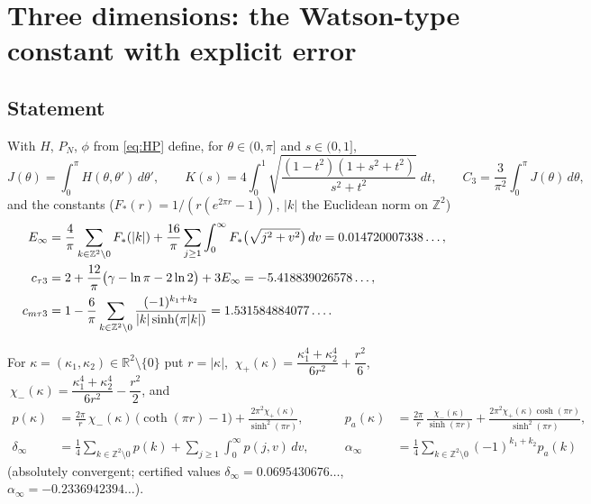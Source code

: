 \documentclass[11pt,a4paper]{article}
\newcommand{\R}{\mathbb R}
\newcommand{\Z}{\mathbb Z}
\theoremstyle{plain}
\theoremstyle{definition}
\numberwithin{equation}{section}
\begin{document}
\section{Three dimensions: the Watson-type constant with explicit error}\label{sec:d3}

\subsection{Statement}
With $H$, $P_N$, $\phi$ from \eqref{eq:HP} define, for $\theta\in(0,\pi]$ and $s\in(0,1]$,
\begin{equation}\label{eq:JK}
J(\theta)=\int_0^\pi H(\theta,\theta')\,d\theta',\qquad K(s)=4\int_0^1\sqrt{\frac{(1-t^2)(1+s^2+t^2)}{s^2+t^2}}\;dt,\qquad C_3=\frac{3}{\pi^2}\int_0^\pi J(\theta)\,d\theta ,
\end{equation}
and the constants ($F_*(r)=1/(r(e^{2\pi r}-1))$, $|k|$ the Euclidean norm on $\Z^2$)
\begin{align}
E_\infty&=\frac4\pi\sum_{k\in\Z^2\setminus0}F_*(|k|)+\frac{16}{\pi}\sum_{j\ge1}\int_0^\infty F_*\big(\sqrt{j^2+v^2}\big)\,dv=0.014720007338\ldots,\notag\\
c_{\tau3}&=2+\frac{12}\pi\big(\gamma-\ln\pi-2\ln2\big)+3E_\infty=-5.418839026578\ldots,\label{eq:c3consts}\\
c_{m\tau3}&=1-\frac6\pi\sum_{k\in\Z^2\setminus0}\frac{(-1)^{k_1+k_2}}{|k|\sinh(\pi|k|)}=1.531584884077\ldots .\notag
\end{align}

For $\kappa=(\kappa_1,\kappa_2)\in\R^2\setminus\{0\}$ put $r=|\kappa|$, $\ \chi_+(\kappa)=\dfrac{\kappa_1^4+\kappa_2^4}{6r^2}+\dfrac{r^2}{6}$, $\ \chi_-(\kappa)=\dfrac{\kappa_1^4+\kappa_2^4}{6r^2}-\dfrac{r^2}{2}$, and
\begin{equation}\label{eq:ppa}
\begin{aligned}
p(\kappa)&=\frac{2\pi}{r}\,\chi_-(\kappa)\,\big(\coth(\pi r)-1\big)+\frac{2\pi^2\chi_+(\kappa)}{\sinh^2(\pi r)},&\qquad
p_a(\kappa)&=\frac{2\pi}{r}\,\frac{\chi_-(\kappa)}{\sinh(\pi r)}+\frac{2\pi^2\chi_+(\kappa)\cosh(\pi r)}{\sinh^2(\pi r)},\\
\delta_\infty&=\frac14\sum_{k\in\Z^2\setminus0}p(k)+\sum_{j\ge1}\int_0^\infty p(j,v)\,dv,&\qquad
\alpha_\infty&=\frac14\sum_{k\in\Z^2\setminus0}(-1)^{k_1+k_2}p_a(k)
\end{aligned}
\end{equation}
(absolutely convergent; certified values $\delta_\infty=0.0695430676\ldots$, $\alpha_\infty=-0.2336942394\ldots$).
\end{document}
